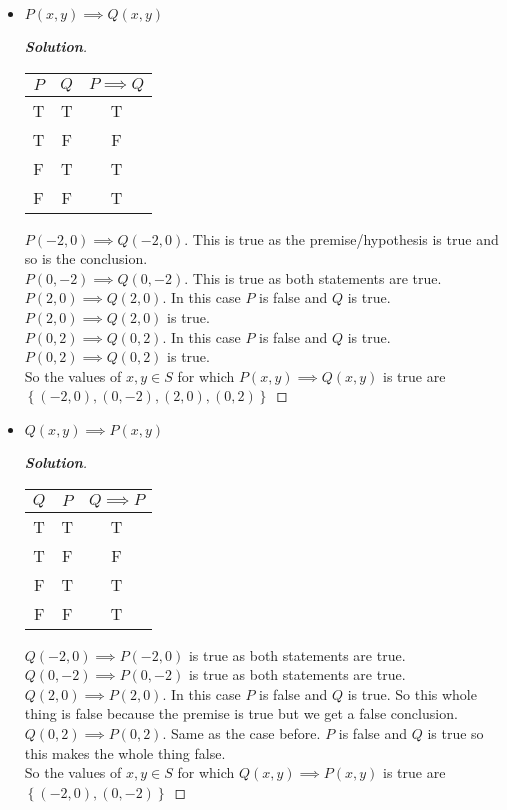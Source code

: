 \documentclass[11pt]{article}
\newenvironment{problem}[2][Problem\!]{\begin{trivlist}
\item[\hskip \labelsep {\bfseries #1}\hskip \labelsep {\bfseries #2.}]}{\end{trivlist}}
\newenvironment{solution}{\begin{proof}[\textbf{\textit{Solution}}]}{\end{proof}}
\newcommand{\set}[1]{\left\{#1\right\}} %
\begin{document}
\begin{problem}{2.2}
\begin{itemize}[itemsep=3em]
\item[(d)] $P(x,y) \implies Q(x,y)$
\begin{solution}
\begin{center}
\begin{tabular}{|c|c|c|}
\hline
$P$ & $Q$ & $P \implies Q$ \\
\hline
T & T & T \\
T & F & F \\
F & T & T \\
F & F & T \\
\hline
\end{tabular}
\end{center}
\(P(-2,0) \implies Q(-2,0)\). This is true as the premise/hypothesis is true and so is the conclusion. \\
\(P(0,-2) \implies Q(0,-2)\). This is true as both statements are true. \\
\(P(2,0) \implies Q(2,0)\). In this case \(P\) is false and \(Q\) is true. \(P(2,0) \implies Q(2,0)\) is true. \\
\(P(0,2) \implies Q(0,2)\). In this case \(P\) is false and \(Q\) is true. \(P(0,2) \implies Q(0,2)\) is true. \\
So the values of \(x,y \in S\) for which \(P(x,y) \implies Q(x,y)\) is true are \(\set{(-2,0),(0,-2),(2,0),(0,2)}\)
\end{solution}

\item[(e)] $Q(x,y) \implies P(x,y)$
\begin{solution}
\begin{center}
\begin{tabular}{|c|c|c|}
\hline
$Q$ & $P$ & $Q \implies P$ \\
\hline
T & T & T \\
T & F & F \\
F & T & T \\
F & F & T \\
\hline
\end{tabular}
\end{center}
\(Q(-2,0) \implies P(-2,0)\) is true as both statements are true. \\
\(Q(0,-2) \implies P(0,-2)\) is true as both statements are true. \\
\(Q(2,0) \implies P(2,0)\). In this case \(P\) is false and \(Q\) is true. So this whole thing is false because the premise is true but we get a false conclusion. \\
\(Q(0,2) \implies P(0,2)\). Same as the case before. \(P\) is false and \(Q\) is true so this makes the whole thing false. \\
So the values of \(x,y \in S\) for which \(Q(x,y) \implies P(x,y)\) is true are \(\set{(-2,0),(0,-2)}\)
\end{solution}


\end{itemize}
\end{problem}
\end{document}
